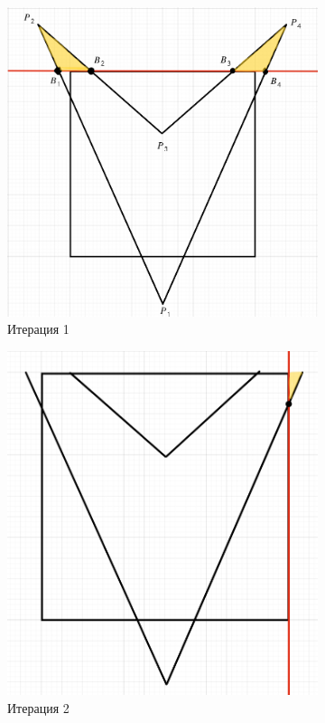 \begin{figure}[H]
    \centering
    \begin{subfigure}[b]{0.5\linewidth}
        \centering
        \includegraphics[width=\linewidth]{screen_1.png}
        \caption{Итерация 1}
        \label{fig:iter1}
    \end{subfigure}
    \hfill
    \begin{subfigure}[b]{0.45\linewidth}
        \centering
        \includegraphics[width=\linewidth]{screen_2.png}
        \caption{Итерация 2}
        \label{fig:iter2}
    \end{subfigure}
    \caption{}
    \label{fig:pair_iter1_iter2}
\end{figure}

